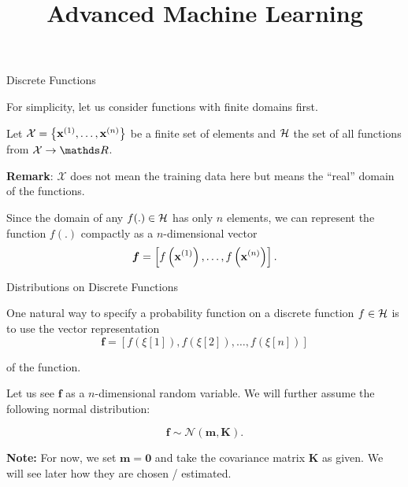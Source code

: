\documentclass[11pt,compress,t,notes=noshow, xcolor=table]{beamer}
\title{Advanced Machine Learning}
\date{}
\begin{document}

\begin{vbframe}{Discrete Functions}

For simplicity, let us consider functions with finite domains first. \\

\lz


Let $\mathcal{X} = \left\{\mathbf{x}^{(1)}, \dots , \mathbf{x}^{(n)}\right\}$ be a finite set of elements and $\mathcal{H}$ the set of all functions from $\mathcal{X} \to \R$.

\textbf{Remark}: $\mathcal{X}$ does not mean the training data here but means the ``real'' domain of the functions.

\lz

Since the domain of any $f(.) \in \mathcal{H}$ has only $n$ elements, we can represent the function $f(.)$ compactly as a $n$-dimensional vector $$\bm{f} = \left[f\left(\mathbf{x}^{(1)}\right), \dots, f\left(\mathbf{x}^{(n)}\right)\right].$$
\end{vbframe}






\begin{vbframe}{Distributions on Discrete Functions}

\vspace*{0.5cm}

One natural way to specify a probability function on a discrete function $f \in \mathcal{H}$ is to use the vector representation
$$
  \bm{f} = \left[f\left(\xi[1]\right), f\left(\xi[2]\right), \dots, f\left(\xi[n]\right)\right]
$$


of the function.

\lz

Let us see $\bm{f}$ as a $n$-dimensional random variable. We will further assume the following normal distribution:

$$
  \bm{f} \sim \mathcal{N}\left(\bm{m}, \bm{K}\right).
$$

\textbf{Note: } For now, we set $\bm{m} = \bm{0}$ and take the covariance matrix $\bm{K}$ as given. We will see later how they are chosen / estimated.

\end{vbframe}
\end{document}
